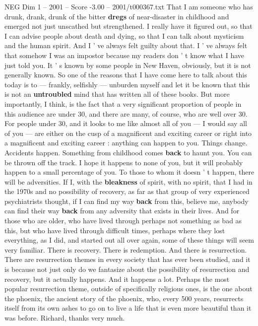 \begin{textsample}{NEG Dim 1 – 2001 – Score -3.00 – 2001/t000367.txt}
That I am someone who has drunk, drank, drunk of the bitter \textbf{dregs} of near-disaster in childhood and emerged not just unscathed but strengthened.
I really have it figured out, so that I can advise people about death and dying, so that I can talk about mysticism and the human spirit.
And I ' ve always felt guilty about that.
I ' ve always felt that somehow I was an impostor because my readers don ' t know what I have just told you.
It ' s known by some people in New Haven, obviously, but it is not generally known.
So one of the reasons that I have come here to talk about this today is to — frankly, selfishly — unburden myself and let it be known that this is not an \textbf{untroubled} mind that has written all of these books.
But more importantly, I think, is the fact that a very significant proportion of people in this audience are under 30, and there are many, of course, who are well over 30.
For people under 30, and it looks to me like almost all of you — I would say all of you — are either on the cusp of a magnificent and exciting career or right into a magnificent and exciting career : anything can happen to you.
Things change.
Accidents happen.
Something from childhood comes \textbf{back} to haunt you.
You can be thrown off the track.
I hope it happens to none of you, but it will probably happen to a small percentage of you.
To those to whom it doesn ' t happen, there will be adversities.
If I, with the \textbf{bleakness} of spirit, with no spirit, that I had in the 1970s and no possibility of recovery, as far as that group of very experienced psychiatrists thought, if I can find my way \textbf{back} from this, believe me, anybody can find their way \textbf{back} from any adversity that exists in their lives.
And for those who are older, who have lived through perhaps not something as bad as this, but who have lived through difficult times, perhaps where they lost everything, as I did, and started out all over again, some of these things will seem very familiar.
There is recovery.
There is redemption.
And there is resurrection.
There are resurrection themes in every society that has ever been studied, and it is because not just only do we fantasize about the possibility of resurrection and recovery, but it actually happens.
And it happens a lot.
Perhaps the most popular resurrection theme, outside of specifically religious ones, is the one about the phoenix, the ancient story of the phoenix, who, every 500 years, resurrects itself from its own ashes to go on to live a life that is even more beautiful than it was before.
Richard, thanks very much.

\end{textsample}
